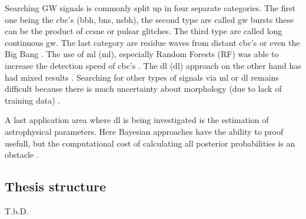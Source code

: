 Searching GW signals is commonly split up in four separate categories. The first one being the \acrshort{cbc}'s (\acrshort{bbh}, \acrshort{bns}, \acrshort{nsbh}), the second type are called \acrshort{gw} bursts these can be the product of \acrshort{ccsne} or pulsar glitches. The third type are called long continuous \acrshort{gw}. The last category are residue waves from distant \acrshort{cbc}'s or even the Big Bang
\citep{abbott2020guide, LIGO_continuous}. The use of \acrlong{ml} (\acrshort{ml}), especially Random Forests (RF) was able to increase the detection speed of \acrshort{cbc}'s \citep{kapadia2017classifier}. The \acrlong{dl} (\acrshort{dl}) approach on the other hand has had mixed results \citep{gebhard2019convolutional,chatterjee2021extraction,ruan2023rapid}. 
Searching for other types of signals via \acrshort{ml} or \acrshort{dl} remains difficult because there is much uncertainty about morphology (due to lack of training data) \citep{cuoco2020enhancing}. 

A last application area where \acrshort{dl} is being investigated is the estimation of astrophysical parameters. Here Bayesian approaches have the ability to proof usefull, but the computational cost of calculating all posterior probabilities is an obstacle \citep{cuoco2020enhancing}.

\subsection{Thesis structure}
T.b.D.
\newpage



